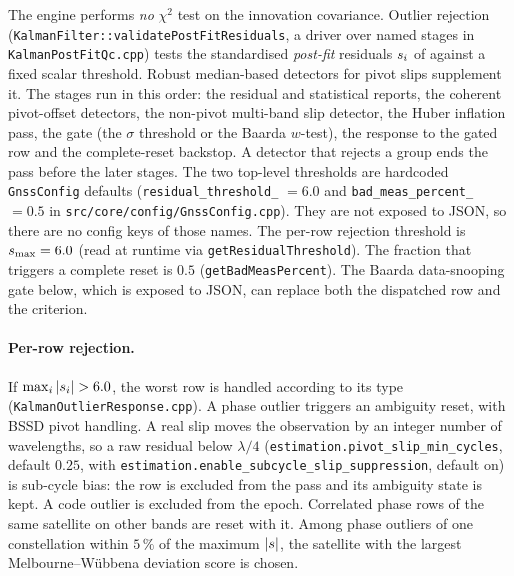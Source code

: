 \documentclass[main.tex]{subfiles}
\begin{document}
The engine performs \emph{no} $\chi^2$ test on the innovation covariance.
Outlier rejection (\texttt{KalmanFilter::validatePostFitResiduals}, a driver
over named stages in \texttt{KalmanPostFitQc.cpp}) tests
the standardised \emph{post-fit} residuals $s_i$ of 
against a fixed scalar threshold.  Robust median-based detectors for
pivot slips supplement it.  The stages run in this order: the residual and
statistical reports, the coherent pivot-offset detectors, the non-pivot
multi-band slip detector, the Huber inflation pass, the gate (the
$\sigma$ threshold or the Baarda $w$-test), the response to the gated row and
the complete-reset backstop.  A detector that rejects a group ends the pass
before the later stages.  The two top-level thresholds are hardcoded
\texttt{GnssConfig} defaults (\texttt{residual\_threshold\_} $= 6.0$ and
\texttt{bad\_meas\_percent\_} $= 0.5$ in
\texttt{src/core/config/GnssConfig.cpp}).  They are not exposed to JSON,
so there are no config keys of those names.  The per-row rejection
threshold is $s_{\max} = 6.0$ (read at runtime via
\texttt{getResidualThreshold}).  The fraction that triggers a complete
reset is $0.5$ (\texttt{getBadMeasPercent}).  The Baarda data-snooping
gate below, which is exposed to JSON, can replace both the dispatched
row and the criterion.

\paragraph{Per-row rejection.}
If $\max_i |s_i| > 6.0$, the worst row is handled according to its
type (\texttt{KalmanOutlierResponse.cpp}).  A phase outlier triggers an
ambiguity reset, with BSSD pivot handling.  A real slip moves the
observation by an integer number of wavelengths, so a raw residual below
$\lambda/4$ (\texttt{estimation.pivot\_slip\_min\_cycles}, default $0.25$,
with \texttt{estimation.enable\_subcycle\_slip\_suppression}, default on) is
sub-cycle bias: the row is excluded from the pass and its ambiguity state is
kept.  A code outlier is excluded from the epoch.  Correlated phase rows of
the same satellite on other bands are reset with it.  Among phase outliers
of one constellation within $5\,\%$ of the maximum $|s|$, the satellite
with the largest Melbourne--W\"ubbena deviation score is chosen.
\end{document}
